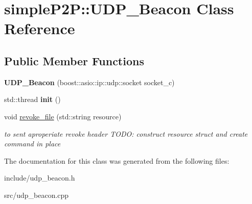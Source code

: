 \hypertarget{classsimpleP2P_1_1UDP__Beacon}{}\section{simple\+P2P\+:\+:U\+D\+P\+\_\+\+Beacon Class Reference}
\label{classsimpleP2P_1_1UDP__Beacon}
\subsection*{Public Member Functions}
\begin{DoxyCompactItemize}
\item 
\mbox{\label{classsimpleP2P_1_1UDP__Beacon_a973dc7749691968beadd474b592bc9c6}} 
{\bfseries U\+D\+P\+\_\+\+Beacon} (boost\+::asio\+::ip\+::udp\+::socket socket\+\_\+c)
\item 
\mbox{\label{classsimpleP2P_1_1UDP__Beacon_aec45f570ce9505c62994d7fe9f8005c3}} 
std\+::thread {\bfseries init} ()
\item 
\mbox{\label{classsimpleP2P_1_1UDP__Beacon_a1fc6e1f02de0351b0ff9702842529f70}} 
void \hyperlink{classsimpleP2P_1_1UDP__Beacon_a1fc6e1f02de0351b0ff9702842529f70}{revoke\+\_\+file} (std\+::string resource)
\begin{DoxyCompactList}\small\item\em to sent aproperiate revoke header T\+O\+DO\+: construct resource struct and create command in place \end{DoxyCompactList}\end{DoxyCompactItemize}


The documentation for this class was generated from the following files\+:\begin{DoxyCompactItemize}
\item 
include/udp\+\_\+beacon.\+h\item 
src/udp\+\_\+beacon.\+cpp\end{DoxyCompactItemize}

